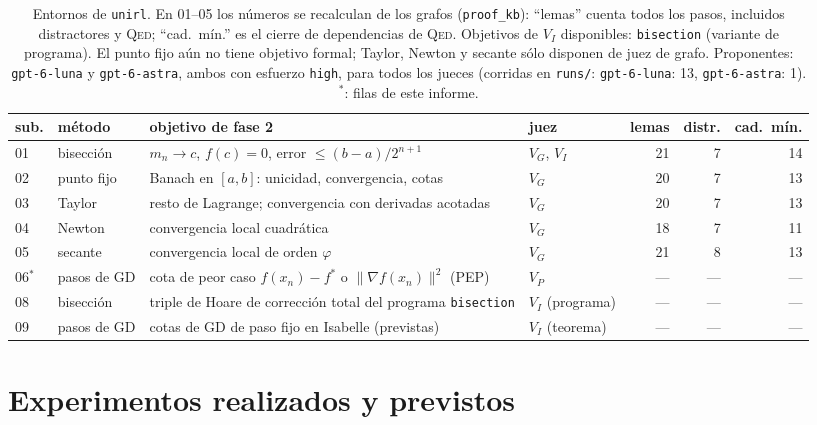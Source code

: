 \documentclass[11pt,a4paper]{article}
\begin{document}
\begin{table}[!ht]
\centering
\footnotesize
\begin{tabular}{@{}llp{5.0cm}lrrr@{}}
\toprule
sub. & método & objetivo de fase 2 & juez & lemas & distr. & cad.\ mín. \\
\midrule
01 & bisección & $m_n \to c$, $f(c)=0$, error $\le (b-a)/2^{n+1}$ & $V_G$, $V_I$ & 21 & 7 & 14 \\
02 & punto fijo & Banach en $[a,b]$: unicidad, convergencia, cotas & $V_G$ & 20 & 7 & 13 \\
03 & Taylor & resto de Lagrange; convergencia con derivadas acotadas & $V_G$ & 20 & 7 & 13 \\
04 & Newton & convergencia local cuadrática & $V_G$ & 18 & 7 & 11 \\
05 & secante & convergencia local de orden $\varphi$ & $V_G$ & 21 & 8 & 13 \\
06$^\ast$ & pasos de GD & cota de peor caso $f(x_n)-f^*$ o $\|\nabla f(x_n)\|^2$ (PEP) & $V_P$ & --- & --- & --- \\
08 & bisección & triple de Hoare de corrección total del programa \texttt{bisection} & $V_I$ (programa) & --- & --- & --- \\
09 & pasos de GD & cotas de GD de paso fijo en Isabelle (previstas) & $V_I$ (teorema) & --- & --- & --- \\
\bottomrule
\end{tabular}
\caption{Entornos de \texttt{unirl}. En 01--05 los números se recalculan de los grafos (\texttt{proof\_kb}): ``lemas'' cuenta todos los pasos, incluidos distractores y \textsc{Qed}; ``cad.\ mín.'' es el cierre de dependencias de \textsc{Qed}. Objetivos de $V_I$ disponibles: \texttt{bisection} (variante de programa). El punto fijo aún no tiene objetivo formal; Taylor, Newton y secante sólo disponen de juez de grafo. Proponentes: \texttt{gpt-6-luna} y \texttt{gpt-6-astra}, ambos con esfuerzo \texttt{high}, para todos los jueces (corridas en \texttt{runs/}: \texttt{gpt-\allowbreak{}6-\allowbreak{}luna}: 13, \texttt{gpt-\allowbreak{}6-\allowbreak{}astra}: 1). $^\ast$: filas de este informe.}
\label{tab:envs}
\end{table}

\section{Experimentos realizados y previstos}
\end{document}
